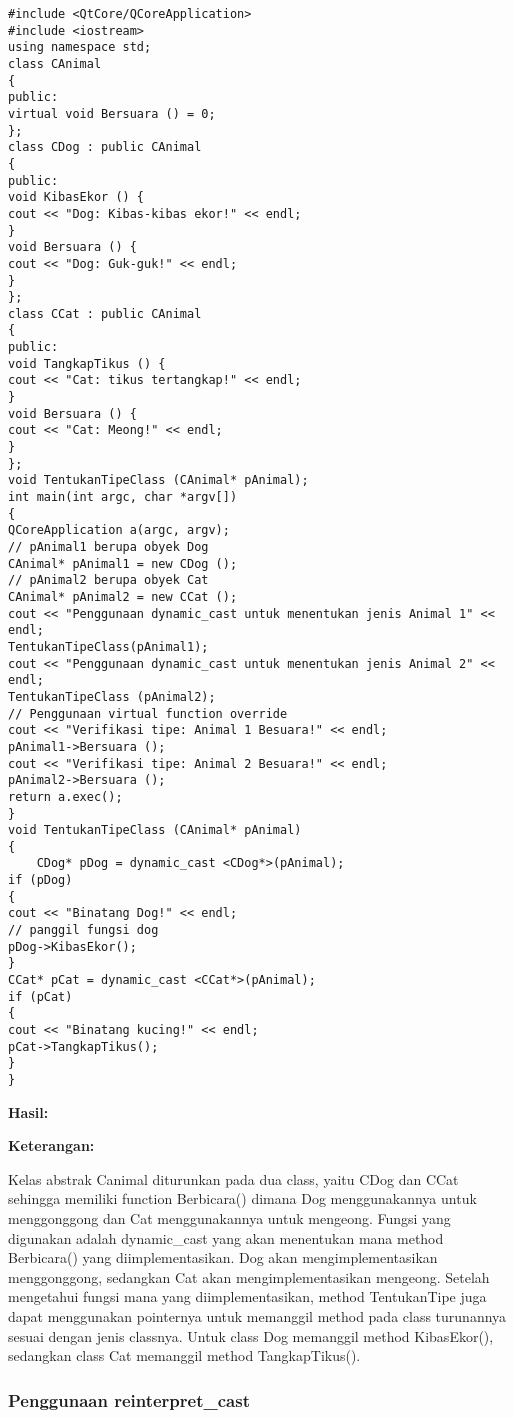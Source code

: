 \begin{verbatim}
#include <QtCore/QCoreApplication>
#include <iostream>
using namespace std;
class CAnimal
{
public:
virtual void Bersuara () = 0;
};
class CDog : public CAnimal
{
public:
void KibasEkor () {
cout << "Dog: Kibas-kibas ekor!" << endl;
}
void Bersuara () {
cout << "Dog: Guk-guk!" << endl;
}
};
class CCat : public CAnimal
{
public:
void TangkapTikus () {
cout << "Cat: tikus tertangkap!" << endl;
}
void Bersuara () {
cout << "Cat: Meong!" << endl;
}
};
void TentukanTipeClass (CAnimal* pAnimal);
int main(int argc, char *argv[])
{
QCoreApplication a(argc, argv);
// pAnimal1 berupa obyek Dog
CAnimal* pAnimal1 = new CDog ();
// pAnimal2 berupa obyek Cat
CAnimal* pAnimal2 = new CCat ();
cout << "Penggunaan dynamic_cast untuk menentukan jenis Animal 1" << endl;
TentukanTipeClass(pAnimal1);
cout << "Penggunaan dynamic_cast untuk menentukan jenis Animal 2" << endl;
TentukanTipeClass (pAnimal2);
// Penggunaan virtual function override
cout << "Verifikasi tipe: Animal 1 Besuara!" << endl;
pAnimal1->Bersuara ();
cout << "Verifikasi tipe: Animal 2 Besuara!" << endl;
pAnimal2->Bersuara ();
return a.exec();
}
void TentukanTipeClass (CAnimal* pAnimal)
{
    CDog* pDog = dynamic_cast <CDog*>(pAnimal);
if (pDog)
{
cout << "Binatang Dog!" << endl;
// panggil fungsi dog
pDog->KibasEkor();
}
CCat* pCat = dynamic_cast <CCat*>(pAnimal);
if (pCat)
{
cout << "Binatang kucing!" << endl;
pCat->TangkapTikus();
}
}
\end{verbatim}

\textbf{Hasil:}

\textbf{Keterangan:}

Kelas abstrak Canimal diturunkan pada dua class, yaitu CDog dan CCat
sehingga memiliki function Berbicara() dimana Dog menggunakannya untuk
menggonggong dan Cat menggunakannya untuk mengeong. Fungsi yang
digunakan adalah dynamic\_cast yang akan menentukan mana method
Berbicara() yang diimplementasikan. Dog akan mengimplementasikan
menggonggong, sedangkan Cat akan mengimplementasikan mengeong. Setelah
mengetahui fungsi mana yang diimplementasikan, method TentukanTipe juga
dapat menggunakan pointernya untuk memanggil method pada class
turunannya sesuai dengan jenis classnya. Untuk class Dog memanggil
method KibasEkor(), sedangkan class Cat memanggil method TangkapTikus().

\subsubsection{Penggunaan
reinterpret\_cast}\label{penggunaan-reinterpretux5fcast}

